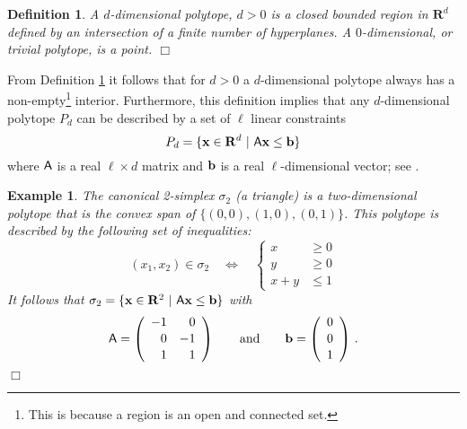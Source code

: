 \documentclass[pdf,12pt,relaxed]{SANDreport}
\newtheorem{defin}{Definition}
\newtheorem{exam}{Example}
\begin{document}
 
     \begin{defin}\label{def:polytope}
     A $d$-dimensional polytope, $d>0$ is a closed bounded region in $\mathbf{R}^d$ defined by an intersection of a finite number of hyperplanes. A $0$-dimensional, or trivial polytope, is a point. \hfill$\Box$
     \end{defin}
                   
      From Definition \ref{def:polytope} it follows that for $d>0$ a $d$-dimensional polytope always has a non-empty\footnote{This is because a region is an open and connected set.} interior. Furthermore, this definition implies that any $d$-dimensional polytope $P_d$ can be described by a set of $\ell$ linear constraints
    \begin{equation}\label{eq:polytope}
    P_d = \{ {\bf x}\in {\mathbf{R}}^d\,\,|\,\, {\sf A}{\bf x} \le {\bf b} \}
    \end{equation}
    where ${\sf A}$ is a real $\ell \times d$ matrix and $\bf{b}$ is a real $\ell$-dimensional vector; see \cite{math:polytope}. 
    
    \begin{exam}\label{ex:2simplex}
    \emph{
    The canonical 2-simplex $\sigma_2$ (a triangle) is a two-dimensional polytope that is the convex span of $\{(0,0), (1,0), (0,1)\}$.  This polytope is described by the following set of inequalities:
    $$
    (x_1,x_2) \in \sigma_2 \quad\Leftrightarrow\quad
    \left\{\begin{array}{rl} x & \ge 0 \\[0.25ex] y& \ge 0 \\[0.25ex] x+y & \le  1 \end{array}\right. 
    $$
    It follows that
    $
    \sigma_2 = \{{\bf x}\in {\bf R}^2 \,\,|\,\, {\sf A}{\bf x} \le {\bf b} \}
    $
    with
    $$
    {\sf A} = \left(\begin{array}{rr} -1&0 \\[0.25ex] 0& -1\\[0.25ex] 1& 1 \end{array}\right)
    \qquad\mbox{and}\qquad
    {\bf b} = \left(\begin{array}{c} 0\\[0.25ex] 0 \\[0.25ex] 1\end{array}\right) \,.
    $$
    }%
    \hfill$\Box$
    \end{exam}
    
\end{document}
